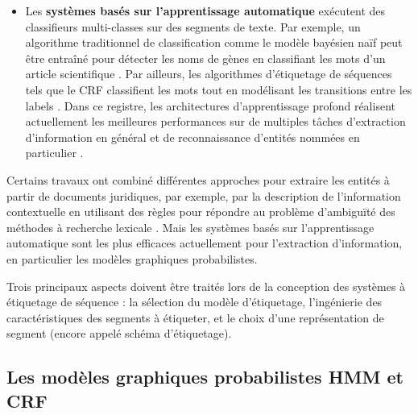 \begin{itemize}

\item Les \textbf{systèmes basés sur l'apprentissage automatique} exécutent des classifieurs multi-classes sur des segments de texte. Par exemple, un algorithme traditionnel de classification comme le modèle bayésien naïf peut être entraîné pour détecter les noms de gènes en classifiant les mots d'un article scientifique \citep{persson2012nbbioner}. Par ailleurs, les algorithmes d'étiquetage de séquences tels que le CRF classifient les mots tout en modélisant les transitions entre les labels \citep{finkel2005stanfordcrfner}. Dans ce registre, les architectures d'apprentissage profond réalisent actuellement les meilleures performances sur de multiples tâches d'extraction d'information en général et de reconnaissance d'entités nommées en particulier \citep{lample2016nnner}.
\end{itemize}
Certains travaux ont combiné différentes approches pour extraire les entités à partir de documents juridiques,  par exemple,  par la description de l'information contextuelle en utilisant des règles pour répondre au problème d'ambiguïté des méthodes à recherche lexicale \citep{mikheev1999NERlexicalWithRules,hanisch2005prominer}. Mais les systèmes basés sur l'apprentissage automatique sont les plus efficaces actuellement pour l'extraction d'information, en particulier les modèles graphiques probabilistes.

Trois principaux aspects doivent être traités lors de la conception des systèmes à étiquetage de séquence : la sélection du modèle d'étiquetage, l'ingénierie des caractéristiques des segments à étiqueter, et le choix d'une représentation de segment (encore appelé schéma d'étiquetage). 

\subsection{Les modèles graphiques probabilistes HMM et CRF}

